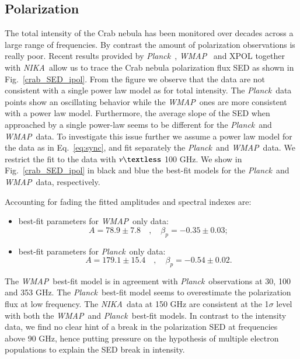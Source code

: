 \documentclass[twocolumn,traditabstract]{aa}
\def\NIKA{\textit{NIKA}}
\def\Planck{\textit{Planck}}
\def\WMAP{\textit{WMAP}}
\begin{document}
\subsection{Polarization}
The total intensity of the Crab nebula has been monitored over decades across a
large range of frequencies. By contrast the amount of polarization observations
is really poor.  Recent results provided by
\Planck\ \citep{2015arXiv150702058P}, \WMAP\ \citep{2011ApJS..192...19W} and
XPOL \citep{aumont2010} together with \NIKA\ allow us to trace the Crab nebula
polarization flux SED as shown in Fig.~\ref{crab_SED_ipol}.  From the
figure we observe that the data are not consistent with a single power law model
as for total intensity.  The \Planck\ data points show an oscillating behavior while
the \WMAP\ ones are more consistent with a power law model. Furthermore, the
average slope of the SED when approached by a single power-law seems to be
different for the \Planck\ and \WMAP\ data.  To investigate this issue further
we assume a power law model for the data as in Eq.~\ref{eq:sync}, and fit
separately the \Planck\ and \WMAP\ data. We restrict the fit to the data with
$\nu \textless$ 100 GHz. We show in Fig.~\ref{crab_SED_ipol} in black and blue
the best-fit models for the \Planck\ and \WMAP\ data, respectively.

Accounting for fading the fitted amplitudes and spectral indexes are:
\begin{itemize}
\item best-fit parameters for \WMAP\ only data:
\begin{equation}
A = 78.9\pm7.8 \quad , \quad \beta_p = -0.35\pm0.03;
\end{equation}
\item best-fit parameters for \Planck\ only data:
\begin{equation}
A = 179.1\pm15.4 \quad , \quad \beta_p = -0.54\pm0.02.
\end{equation}
\end{itemize}

The \WMAP\ best-fit model is in agreement with \Planck\ observations at 30, 100
and 353 GHz.  The \Planck\ best-fit model seems to overestimate the polarization
flux at low frequency.  The \NIKA\ data at 150 GHz are consistent at the
1$\sigma$ level with both the \WMAP\ and \Planck\ best-fit models.  In contrast
to the intensity data, we find no clear hint of a break in the polarization SED
at frequencies above 90 GHz, hence putting pressure on the hypothesis of
  multiple electron populations to explain the SED break in intensity.
\end{document}
